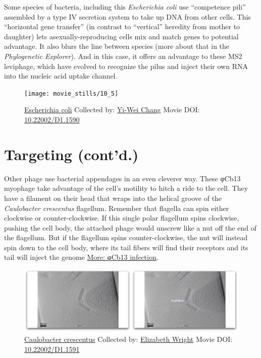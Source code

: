 \documentclass[]{tufte-book}
\begin{document}
Some species of bacteria, including this \emph{Escherichia coli} use
``competence pili'' assembled by a type IV secretion system to take up
DNA from other cells. This ``horizontal gene transfer'' (in contrast to
``vertical'' heredity from mother to daughter) lets
asexually-reproducing cells mix and match genes to potential advantage.
It also blurs the line between species (more about that in the
\emph{Phylogenetic Explorer}). And in this case, it offers an advantage
to these MS2 leviphage, which have evolved to recognize the pilus and
inject their own RNA into the nucleic acid uptake channel.





\begin{figure}
\texttt{[image: movie\_stills/10\_5]} \caption[\protect\hyperlink{tree}{Escherichia coli} Collected by:
\protect\hyperlink{yi-wei_chang}{Yi-Wei Chang} Movie DOI:
\href{https://doi.org/10.22002/D1.1590}{10.22002/D1.1590}]{\protect\hyperlink{tree}{Escherichia coli} Collected by:
\protect\hyperlink{yi-wei_chang}{Yi-Wei Chang} Movie DOI:
\href{https://doi.org/10.22002/D1.1590}{10.22002/D1.1590}}\label{fig:10-5}
\end{figure}

\section{Targeting (cont'd.)}\label{targeting-contd.}

Other phage use bacterial appendages in an even cleverer way. These
φCb13 myophage take advantage of the cell's motility to hitch a ride to
the cell. They have a filament on their head that wraps into the helical
groove of the \emph{Caulobacter crescentus} flagellum. Remember that
flagella can spin either clockwise or counter-clockwise. If this single
polar flagellum spins clockwise, pushing the cell body, the attached
phage would unscrew like a nut off the end of the flagellum. But if the
flagellum spins counter-clockwise, the nut will instead spin down to the
cell body, where its tail fibers will find their receptors and its tail
will inject the genome \protect\hyperlink{ux3c6Cb13_infection}{More:
φCb13 infection}.





\begin{figure}
\includegraphics{movie_stills/10_6} \caption[\protect\hyperlink{tree}{Caulobacter crescentus} Collected
by: \protect\hyperlink{elizabeth_wright}{Elizabeth Wright} Movie DOI:
\href{https://doi.org/10.22002/D1.1591}{10.22002/D1.1591}]{\protect\hyperlink{tree}{Caulobacter crescentus} Collected
by: \protect\hyperlink{elizabeth_wright}{Elizabeth Wright} Movie DOI:
\href{https://doi.org/10.22002/D1.1591}{10.22002/D1.1591}}\label{fig:10-6}
\end{figure}
\end{document}
